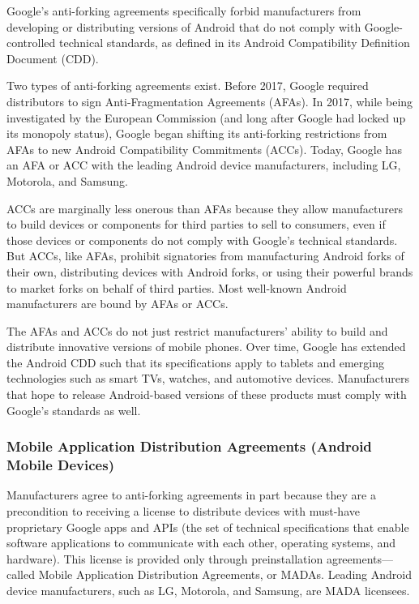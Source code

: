 \documentclass[11pt,b5paper,headings=small]{scrartcl}
\begin{document}

Google’s anti-forking agreements specifically forbid manufacturers from
developing or distributing versions of Android that do not comply with Google-controlled
technical standards, as defined in its Android Compatibility Definition Document (CDD).


Two types of anti-forking agreements exist. Before 2017, Google required
distributors to sign Anti-Fragmentation Agreements (AFAs). In 2017, while being investigated
by the European Commission (and long after Google had locked up its monopoly status), Google
began shifting its anti-forking restrictions from AFAs to new Android Compatibility
Commitments (ACCs). Today, Google has an AFA or ACC with the leading Android device
manufacturers, including LG, Motorola, and Samsung.


ACCs are marginally less onerous than AFAs because they allow manufacturers
to build devices or components for third parties to sell to consumers, even if those devices or
components do not comply with Google’s technical standards. But ACCs, like AFAs, prohibit
signatories from manufacturing Android forks of their own, distributing devices with Android
forks, or using their powerful brands to market forks on behalf of third parties. Most well-known
Android manufacturers are bound by AFAs or ACCs.


The AFAs and ACCs do not just restrict manufacturers’ ability to build and
distribute innovative versions of mobile phones. Over time, Google has extended the Android
CDD such that its specifications apply to tablets and emerging technologies such as smart TVs,
watches, and automotive devices. Manufacturers that hope to release Android-based versions of
these products must comply with Google’s standards as well.




\subsubsection{Mobile Application Distribution Agreements (Android Mobile Devices)}
Manufacturers agree to anti-forking agreements in part because they are a
precondition to receiving a license to distribute devices with must-have proprietary Google apps
and APIs (the set of technical specifications that enable software applications to communicate
with each other, operating systems, and hardware). This license is provided only through
preinstallation agreements—called Mobile Application Distribution Agreements, or MADAs.
Leading Android device manufacturers, such as LG, Motorola, and Samsung, are MADA
licensees.
\end{document}
